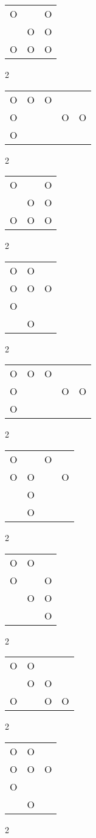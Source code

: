\begin{tabular}{|m{0.2cm}m{0.2cm}m{0.2cm}|}\hline
O& &O\\
 &O&O\\
O&O&O\\
\hline\end{tabular}2
\begin{tabular}{|m{0.2cm}m{0.2cm}m{0.2cm}m{0.2cm}m{0.2cm}|}\hline
O&O&O& & \\
O& & &O&O\\
O& & & & \\
\hline\end{tabular}2
\begin{tabular}{|m{0.2cm}m{0.2cm}m{0.2cm}|}\hline
O& &O\\
 &O&O\\
O&O&O\\
\hline\end{tabular}2
\begin{tabular}{|m{0.2cm}m{0.2cm}m{0.2cm}|}\hline
O&O& \\
O&O&O\\
O& & \\
 &O& \\
\hline\end{tabular}2
\begin{tabular}{|m{0.2cm}m{0.2cm}m{0.2cm}m{0.2cm}m{0.2cm}|}\hline
O&O&O& & \\
O& & &O&O\\
O& & & & \\
\hline\end{tabular}2
\begin{tabular}{|m{0.2cm}m{0.2cm}m{0.2cm}m{0.2cm}|}\hline
O& &O& \\
O&O& &O\\
 &O& & \\
 &O& & \\
\hline\end{tabular}2
\begin{tabular}{|m{0.2cm}m{0.2cm}m{0.2cm}|}\hline
O&O& \\
O& &O\\
 &O&O\\
 & &O\\
\hline\end{tabular}2
\begin{tabular}{|m{0.2cm}m{0.2cm}m{0.2cm}m{0.2cm}|}\hline
O&O& & \\
 &O&O& \\
O& &O&O\\
\hline\end{tabular}2
\begin{tabular}{|m{0.2cm}m{0.2cm}m{0.2cm}|}\hline
O&O& \\
O&O&O\\
O& & \\
 &O& \\
\hline\end{tabular}2
